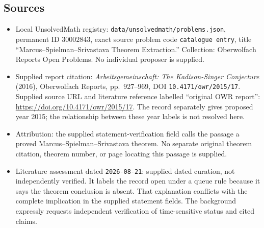 \documentclass[11pt]{article}
\begin{document}
\subsection{Sources}
\begin{itemize}
\item Local UnsolvedMath registry: \texttt{data/unsolvedmath/problems.json}, permanent ID \(30002843\), exact source problem code \texttt{catalogue entry}, title ``Marcus--Spielman--Srivastava Theorem Extraction.'' Collection: Oberwolfach Reports Open Problems. No individual proposer is supplied.
\item Supplied report citation: \emph{Arbeitsgemeinschaft: The Kadison-Singer Conjecture} (2016), Oberwolfach Reports, pp.~927--969, DOI \texttt{10.4171/owr/2015/17}. Supplied source URL and literature reference labelled ``original OWR report'': \url{https://doi.org/10.4171/owr/2015/17}. The record separately gives proposed year 2015; the relationship between these year labels is not resolved here.
\item Attribution: the supplied statement-verification field calls the passage a proved Marcus--Spielman--Srivastava theorem. No separate original theorem citation, theorem number, or page locating this passage is supplied.
\item Literature assessment dated \texttt{2026-08-21}: supplied dated curation, not independently verified. It labels the record open under a queue rule because it says the theorem conclusion is absent. That explanation conflicts with the complete implication in the supplied statement fields. The background expressly requests independent verification of time-sensitive status and cited claims.
\end{itemize}
\end{document}
